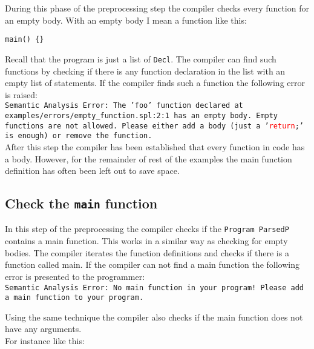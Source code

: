 \documentclass{report}
\begin{document}
During this phase of the preprocessing step the compiler checks every function for an empty body. With an empty body I mean a function like this:

\begin{lstlisting}[style=SPL]
main() {}
\end{lstlisting}

Recall that the program is just a list of \texttt{Decl}. The compiler can find such functions by checking if there is any function declaration in the list with an empty list of statements. If the compiler finds such a function the following error is raised:
\vspace{.1cm}\\
\noindent\small\texttt{\textcolor{error}{Semantic Analysis Error: The '\textcolor{name}{foo}' function declared at }\textcolor{filename}{examples/errors/empty\_function.spl:2:1} \textcolor{error}{has an empty body.} Empty functions are not allowed. Please either add a body (just a '\textcolor{red}{return};' is enough) or remove the function.}
\vspace{.1cm}\\
\noindent After this step the compiler has been established that every function in code has a body. 
However, for the remainder of rest of the examples the main function definition has often been left out to save space.

\subsection{Check the \texttt{main} function} \label{sec:Checking-main}

In this step of the preprocessing the compiler checks if the \texttt{Program ParsedP} contains a main function. 
This works in a similar way as checking for empty bodies. The compiler iterates the function definitions and checks if there is a function called main.
If the compiler can not find a main function the following error is presented to the programmer:
\vspace{.1cm}\\
\noindent\small\texttt{\textcolor{error}{Semantic Analysis Error: No main function in your program!}
Please add a main function to your program.}
\vspace{.01cm}

\noindent Using the same technique the compiler also checks if the main function does not have any arguments. \\For instance like this:
\end{document}
